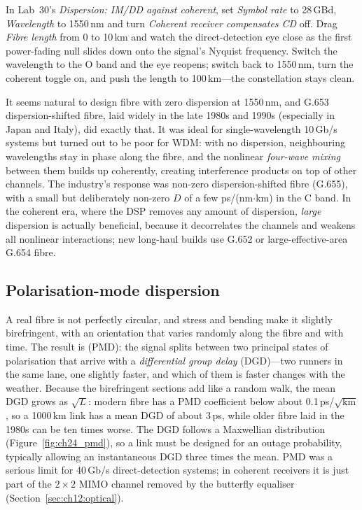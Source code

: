 \begin{tryit}
In Lab~30's \emph{Dispersion: IM/DD against coherent}, set \emph{Symbol rate} to 28\,GBd,
\emph{Wavelength} to 1550\,nm and turn \emph{Coherent receiver compensates CD} off. Drag \emph{Fibre
length} from 0 to 10\,km and watch the direct-detection eye close as the first power-fading null
slides down onto the signal's Nyquist frequency. Switch the wavelength to the O band and the eye
reopens; switch back to 1550\,nm, turn the coherent toggle on, and push the length to 100\,km---the
constellation stays clean.
\end{tryit}



\begin{pitfall}
It seems natural to design fibre with zero dispersion at 1550\,nm, and G.653 dispersion-shifted fibre,
laid widely in the late 1980s and 1990s (especially in Japan and Italy), did exactly that. It was ideal
for single-wavelength 10\,Gb/s systems but turned out to be poor for WDM: with no dispersion, neighbouring
wavelengths stay in phase along the fibre, and the nonlinear \emph{four-wave mixing} between them builds
up coherently, creating interference products on top of other channels. The industry's response was
non-zero dispersion-shifted fibre (G.655), with a small but deliberately non-zero $D$ of a few
ps/(nm$\cdot$km) in the C band. In the coherent era, where the DSP removes any amount of dispersion,
\emph{large} dispersion is actually beneficial, because it decorrelates the channels and weakens all
nonlinear interactions; new long-haul builds use G.652 or large-effective-area G.654 fibre.
\end{pitfall}

\subsection{Polarisation-mode dispersion}

A real fibre is not perfectly circular, and stress and bending make it slightly birefringent, with an
orientation that varies randomly along the fibre and with time. The result is
 (PMD): the signal splits between two principal states of polarisation
that arrive with a \emph{differential group delay} (DGD)---two runners in the same lane, one slightly
faster, and which of them is faster changes with the weather. Because the birefringent sections add like
a random walk, the mean DGD grows as $\sqrt L$: modern fibre has a PMD coefficient below about
0.1\,ps/$\sqrt{\text{km}}$, so a 1000\,km link has a mean DGD of about 3\,ps, while older fibre laid in the
1980s can be ten times worse. The DGD follows a Maxwellian distribution (Figure~\ref{fig:ch24_pmd}), so a
link must be designed for an outage probability, typically allowing an instantaneous DGD three times the
mean. PMD was a serious limit for 40\,Gb/s direct-detection systems; in coherent receivers it is just
part of the $2\times2$ MIMO channel removed by the butterfly equaliser (Section~\ref{sec:ch12:optical}).


